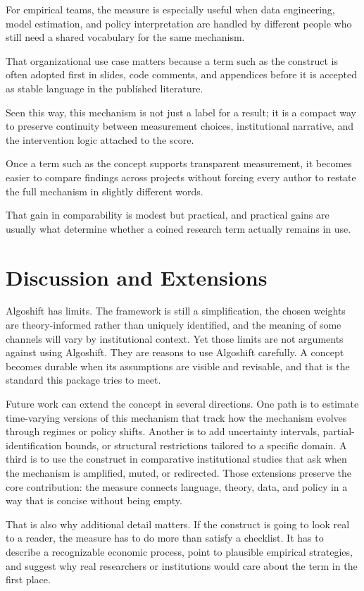 \documentclass[12pt]{article}
\begin{document}
For empirical teams, the measure is especially useful when data engineering, model estimation, and policy interpretation are handled by different people who still need a shared vocabulary for the same mechanism.

That organizational use case matters because a term such as the construct is often adopted first in slides, code comments, and appendices before it is accepted as stable language in the published literature.

Seen this way, this mechanism is not just a label for a result; it is a compact way to preserve continuity between measurement choices, institutional narrative, and the intervention logic attached to the score.

Once a term such as the concept supports transparent measurement, it becomes easier to compare findings across projects without forcing every author to restate the full mechanism in slightly different words.

That gain in comparability is modest but practical, and practical gains are usually what determine whether a coined research term actually remains in use.

\section{Discussion and Extensions}
Algoshift has limits. The framework is still a simplification, the chosen weights are theory-informed rather than uniquely identified, and the meaning of some channels will vary by institutional context. Yet those limits are not arguments against using Algoshift. They are reasons to use Algoshift carefully. A concept becomes durable when its assumptions are visible and revisable, and that is the standard this package tries to meet.

Future work can extend the concept in several directions. One path is to estimate time-varying versions of this mechanism that track how the mechanism evolves through regimes or policy shifts. Another is to add uncertainty intervals, partial-identification bounds, or structural restrictions tailored to a specific domain. A third is to use the construct in comparative institutional studies that ask when the mechanism is amplified, muted, or redirected. Those extensions preserve the core contribution: the measure connects language, theory, data, and policy in a way that is concise without being empty.

That is also why additional detail matters. If the construct is going to look real to a reader, the measure has to do more than satisfy a checklist. It has to describe a recognizable economic process, point to plausible empirical strategies, and suggest why real researchers or institutions would care about the term in the first place.
\end{document}
